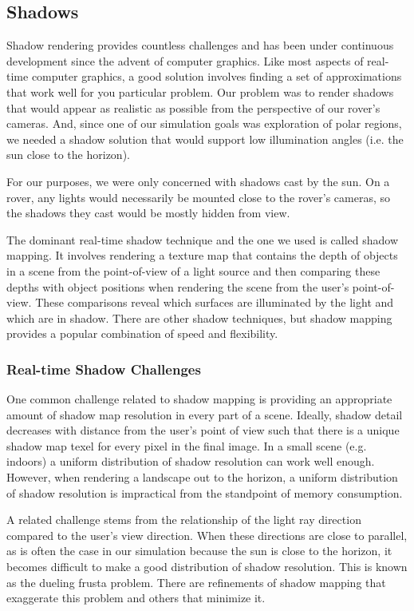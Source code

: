 \documentclass[twocolumn,letterpaper]{IEEEAerospaceCLS}  %
\begin{document}
\subsection{Shadows}
Shadow rendering provides countless challenges and has been under continuous development since the advent of computer graphics. Like most aspects of real-time computer graphics, a good solution involves finding a set of approximations that work well for you particular problem. Our problem was to render shadows that would appear as realistic as possible from the perspective of our rover's cameras. And, since one of our simulation goals was exploration of polar regions, we needed a shadow solution that would support low illumination angles (i.e. the sun close to the horizon).

For our purposes, we were only concerned with shadows cast by the sun. On a rover, any lights would necessarily be mounted close to the rover's cameras, so the shadows they cast would be mostly hidden from view.

The dominant real-time shadow technique and the one we used is called shadow mapping. It involves rendering a texture map that contains the depth of objects in a scene from the point-of-view of a light source and then comparing these depths with object positions when rendering the scene from the user's point-of-view. These comparisons reveal which surfaces are illuminated by the light and which are in shadow. There are other shadow techniques, but shadow mapping provides a popular combination of speed and flexibility.

\subsubsection{Real-time Shadow Challenges}
One common challenge related to shadow mapping is providing an appropriate amount of shadow map resolution in every part of a scene. Ideally, shadow detail decreases with distance from the user's point of view such that there is a unique shadow map texel for every pixel in the final image. In a small scene (e.g. indoors) a uniform distribution of shadow resolution can work well enough. However, when rendering a landscape out to the horizon, a uniform distribution of shadow resolution is impractical from the standpoint of memory consumption.

A related challenge stems from the relationship of the light ray direction compared to the user's view direction. When these directions are close to parallel, as is often the case in our simulation because the sun is close to the horizon, it becomes difficult to make a good distribution of shadow resolution. This is known as the dueling frusta problem. There are refinements of shadow mapping that exaggerate this problem and others that minimize it.
\end{document}

